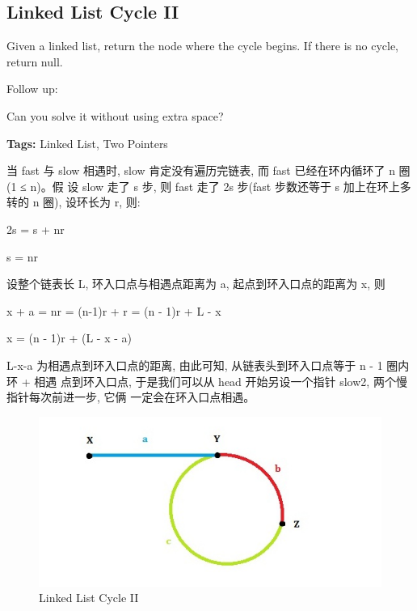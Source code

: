 \documentclass[12pt]{book}
\begin{document}
\subsection{Linked List Cycle II}
\label{sec-3-2-11}

Given a linked list, return the node where the cycle begins. If there is no cycle, return null.

Follow up:

Can you solve it without using extra space?

\textbf{Tags:} Linked List, Two Pointers

当 fast 与 slow 相遇时, slow 肯定没有遍历完链表, 而 fast 已经在环内循环了 n 圈 (1 ≤ n)。假
设 slow 走了 s 步, 则 fast 走了 2s 步(fast 步数还等于 s 加上在环上多转的 n 圈), 设环长为 r, 则:

2s = s + nr

s = nr

设整个链表长 L, 环入口点与相遇点距离为 a, 起点到环入口点的距离为 x, 则

x + a = nr = (n-1)r + r = (n - 1)r + L - x

x = (n - 1)r + (L - x - a)

L-x-a 为相遇点到环入口点的距离, 由此可知, 从链表头到环入口点等于 n - 1 圈内环 + 相遇
点到环入口点, 于是我们可以从 head 开始另设一个指针 slow2, 两个慢指针每次前进一步, 它俩
一定会在环入口点相遇。

\begin{figure}[htb]
\centering
\includegraphics[width=.9\linewidth]{./pic/listcycle.jpg}
\caption{Linked List Cycle II}
\end{figure}
\end{document}
